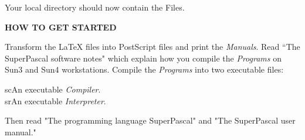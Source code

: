 Your local directory should now contain the Files.

\begin{center}
  {\bf HOW TO GET STARTED}
\end{center}

\noindent
Transform the {\LaTeX} files into PostScript files and
print the {\it Manuals}. Read ``The SuperPascal software
notes" which explain how you compile the {\it Programs}
on Sun3 and Sun4 workstations. Compile the {\it Programs}
into two executable files:

\begin{program}{14.1em}
  {\PA}sc{\blank}An executable {\it Compiler}.   \\
  {\PA}sr{\blank}An executable {\it Interpreter}.\\
\end{program}

Then read "The programming language SuperPascal" and "The
SuperPascal user manual."


